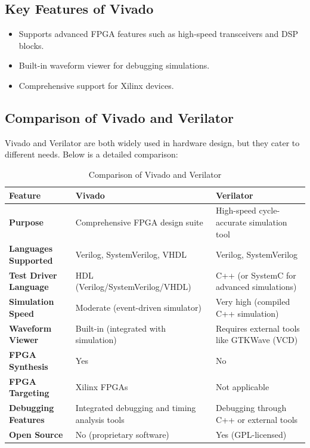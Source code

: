 \subsection{Key Features of Vivado}
\begin{itemize}
    \item Supports advanced FPGA features such as high-speed transceivers and DSP blocks.
    \item Built-in waveform viewer for debugging simulations.
    \item Comprehensive support for Xilinx devices.
\end{itemize}

\subsection{Comparison of Vivado and Verilator}
Vivado and Verilator are both widely used in hardware design, but they cater to different needs. Below is a detailed comparison:

\begin{table}[htbp]
\renewcommand{\arraystretch}{2} %
\centering
\begin{tabular}{@{}p{4cm}p{5cm}p{4cm}@{}}
\toprule
\textbf{Feature}              & \textbf{Vivado}                                & \textbf{Verilator}                              \\ \midrule
\textbf{Purpose}              & Comprehensive FPGA design suite                & High-speed cycle-accurate simulation tool       \\
\textbf{Languages Supported}  & Verilog, SystemVerilog, VHDL                   & Verilog, SystemVerilog                         \\
\textbf{Test Driver Language} & HDL (Verilog/SystemVerilog/VHDL)               & C++ (or SystemC for advanced simulations)      \\
\textbf{Simulation Speed}     & Moderate (event-driven simulator)              & Very high (compiled C++ simulation)            \\
\textbf{Waveform Viewer}      & Built-in (integrated with simulation)          & Requires external tools like GTKWave (VCD)     \\
\textbf{FPGA Synthesis}       & Yes                                           & No                                             \\
\textbf{FPGA Targeting}       & Xilinx FPGAs                                   & Not applicable                                 \\
\textbf{Debugging Features}   & Integrated debugging and timing analysis tools & Debugging through C++ or external tools        \\
\textbf{Open Source}          & No (proprietary software)                      & Yes (GPL-licensed)                             \\ \bottomrule
\end{tabular}
\caption{Comparison of Vivado and Verilator}
\label{tab:vivado_vs_verilator}
\end{table}

